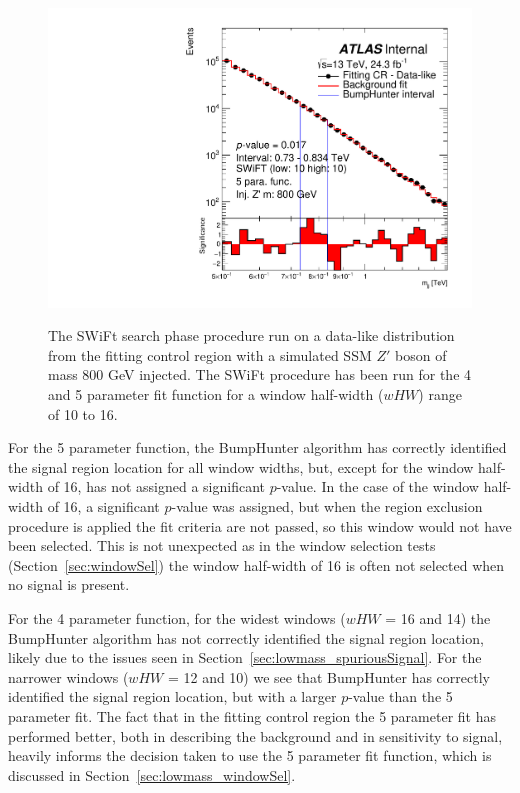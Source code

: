 \begin{figure}[!htb]
{}
 {
  \includegraphics[width=0.45\linewidth, angle=0]{figs/Dibjet/LowMass/FitStudy/bhFit_corrFitCR_dataLike_5para_low10_high10_inj_Zprimebb800_xsFactor1.pdf}
}
\vspace{10pt}
\caption{\label{fig:bhFit_lm_corrFitCR_dataLike_inj_Zprimebb800_xsFactor1}
  The SWiFt search phase procedure run on a data-like distribution
  from the fitting control region with a simulated SSM $Z'$ boson of mass 800 GeV injected.
  The SWiFt procedure has been run for the 4 and 5 parameter fit function for a window half-width ($wHW$) range of 10 to 16.
}
\end{figure}

For the 5 parameter function, the {\sc BumpHunter} algorithm has correctly identified the signal region location for all window widths,
but, except for the window half-width of 16, has not assigned a significant \mbox{\mbox{$p$-value}}.
In the case of the window half-width of 16, a significant \mbox{$p$-value} was assigned,
but when the region exclusion procedure is applied the fit criteria are not passed,
so this window would not have been selected.
This is not unexpected as in the window selection tests (Section~\ref{sec:windowSel})
the window half-width of 16 is often not selected when no signal is present.

For the 4 parameter function, for the widest windows ($wHW$ = 16 and 14) the {\sc BumpHunter} algorithm has not correctly identified the signal region location,
likely due to the issues seen in Section~\ref{sec:lowmass_spuriousSignal}.
For the narrower windows ($wHW$ = 12 and 10) we see that {\sc BumpHunter} has correctly identified the signal region location,
but with a larger \mbox{$p$-value} than the 5 parameter fit.
The fact that in the fitting control region the 5 parameter fit has performed better, both in describing the background and in sensitivity to signal,
heavily informs the decision taken to use the 5 parameter fit function, which is discussed in Section~\ref{sec:lowmass_windowSel}.

